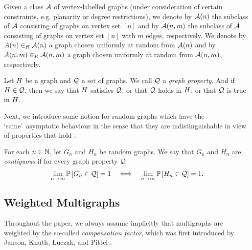 \begin{definition}\label{CBdef:graph_class}
Given a class $\mathcal{A}$ of vertex-labelled graphs (under consideration of certain constraints, e.g. planarity or degree restrictions), we denote by 
$\mathcal{A}(n)$ the subclass of $\mathcal{A}$ consisting of graphs on vertex set $[n]$ 
and by $\mathcal{A}(n,m)$ the subclass of $\mathcal{A}$ consisting of graphs on vertex set $[n]$ with $m$ edges, respectively. We denote 
by $A(n)\in_R \mathcal{A}(n)$ a graph chosen uniformly at random from $\mathcal{A}(n)$
and by $A(n,m)\in_R \mathcal{A}(n,m)$ a graph chosen uniformly at random from $\mathcal{A}(n,m)$, respectively.
\end{definition}

\begin{definition}
Let $H$ be a graph and $\mathcal{Q}$ a set of graphs. We call $\mathcal{Q}$ a {\em graph property}. And if $H \in \mathcal{Q}$, then we say that $H$ satisfies $\mathcal{Q}$; or that $\mathcal{Q}$ holds in $H$; or that $\mathcal{Q}$ is true in $H$.
\end{definition}

Next, we introduce some notion for random graphs which have the \lq same\rq\ asymptotic behaviour in the sense that they are indistinguishable in view of properties that hold \whp.
\begin{definition}\label{CBdef:contiguous}
For each $n\in \mathbb{N}$, let $G_n$ and $H_n$ be random graphs. We say that $G_n$ and $H_n$ are {\em contiguous} if for every graph property $\mathcal{Q}$
\begin{align*}
\lim_{n \to \infty}\mathbb{P}\left[G_n \in \mathcal{Q}\right] = 1 \quad \Longleftrightarrow \quad \lim_{n \to \infty}\mathbb{P}\left[H_n \in\mathcal{Q}\right] = 1.
\end{align*}
\end{definition}

\subsection{Weighted Multigraphs}
Throughout the paper, we always assume implicitly that multigraphs are weighted by the so-called {\em compensation factor}, which was first introduced by Janson, Knuth, {\L}uczak, and Pittel \cite{JansonKnuthLuczakPittel1993}.

